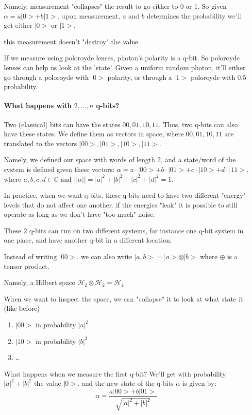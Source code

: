 Namely, measurement "collapses" the result to go either to 0 or 1.
So given $\alpha=a|0>+b|1>$, upon measurement, 
$a$ and $b$ determines the probability we'll get either $|0>$ or $|1>$.

this measurement doesn't "destroy" the value.

If we measure using poloroyde lenses, photon's polarity is a q-bit. So poloroyde lenses can help us look at the 'state'.
Given a uniform random photon, it'll either go through a poloroyde with $|0>$ polarity, or through a $|1>$ poloroyde with $0.5$ probability.

\paragraph{What happens with $2,\dots,n$ q-bits?}
Two (classical) bits can have the states $00,01,10,11$.
Thus, two q-bits can also have these states. We define them as vectors in space, where $00,01,10,11$ are translated to the vectors $|00>, |01>, |10>, |11>$.

Namely, we defined our space with words of length $2$, and a state/word of the system is defined given these vectors:
$\alpha=a \cdot |00>+b \cdot |01>+c \cdot |10>+d \cdot |11>$, where $a,b,c,d\in \mathbb{C}$ and $||\alpha||=|a|^2+|b|^2+|c|^2+|d|^2=1$.

In practice, when we want q-bits, these q-bits need to have two different "energy" levels that do not affect one another.
if the energies "leak" it is possible to still operate as long as we don't have "too much" noise.

These $2$ q-bits can run on two different systems, for instance one q-bit system in one place, and have another q-bit in a different location. 

Instead of writing $|00>$, we can also write
$|a,b>=|a>\otimes |b>$ where $\oplus$ is a tensor product.

Namely, a Hilbert space $\mathcal{H}_2\otimes \mathcal{H}_2= \mathcal{H}_4$

When we want to inspect the space, we can "collapse" it to look at what state it (like before)
\begin{enumerate}
 \item $|00>$ in probability $|a|^2$
 \item $|10>$ in probability $|b|^2$
 \item \dots
\end{enumerate}

What happens when we measure the first q-bit?
We'll get with probability $|a|^2+|b|^2$ the value $|0>$.
and the new state of the q-bits $\alpha$ is given by:
$$\alpha=\frac{a|00>+b|01>}{\sqrt{|a|^2+|b|^2}} $$

